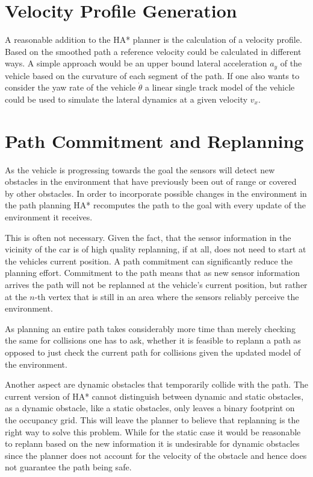 \section{Velocity Profile Generation}
	A reasonable addition to the HA* planner is the calculation of a velocity profile. Based on the smoothed path a reference velocity could be calculated in different ways. A simple approach would be an upper bound lateral acceleration $a_y$ of the vehicle based on the curvature of each segment of the path. If one also wants to consider the yaw rate of the vehicle $\dot{\theta}$ a linear single track model of the vehicle could be used to simulate the lateral dynamics at a given velocity $v_x$. 

\section{Path Commitment and Replanning}
	As the vehicle is progressing towards the goal the sensors will detect new obstacles in the environment that have previously been out of range or covered by other obstacles. In order to incorporate possible changes in the environment in the path planning HA* recomputes the path to the goal with every update of the environment it receives.
	
	This is often not necessary. Given the fact, that the sensor information in the vicinity of the car is of high quality replanning, if at all, does not need to start at the vehicles current position. A path commitment can significantly reduce the planning effort. Commitment to the path means that as new sensor information arrives the path will not be replanned at the vehicle's current position, but rather at the $n$-th vertex that is still in an area where the sensors reliably perceive the environment.
	
	As planning an entire path takes considerably more time than merely checking the same for collisions one has to ask, whether it is feasible to replann a path as opposed to just check the current path for collisions given the updated model of the environment.
	
	Another aspect are dynamic obstacles that temporarily collide with the path. The current version of HA* cannot distinguish between dynamic and static obstacles, as a dynamic obstacle, like a static obstacles, only leaves a binary footprint on the occupancy grid. This will leave the planner to believe that replanning is the right way to solve this problem. While for the static case it would be reasonable to replann based on the new information it is undesirable for dynamic obstacles since the planner does not account for the velocity of the obstacle and hence does not guarantee the path being safe.
	
